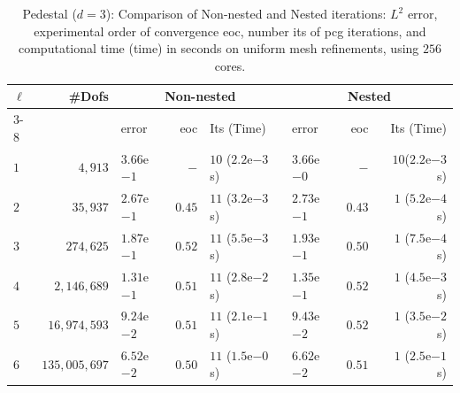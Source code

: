 \documentclass{article}
\numberwithin{equation}{section}
\begin{document}
\begin{table}[ht]
  {\small
    \begin{tabular}{|l|r|l|r|l|l|r|r|}
      \hline
      \multirow{2}{*}{$\ell$}&\multirow{2}{*}{\#Dofs}&
      \multicolumn{3}{c|}{Non-nested}&\multicolumn{3}{c|}{Nested} \\  \cline{3-8}
      &&error&eoc &Its (Time) &error&eoc & Its (Time)\\
      \hline
      $1$&$4,913$&$3.66$e$-1$&$-$&$10$ ($2.2$e$-3$ s)&$3.66$e$-0$& $-$ &$10$($2.2$e$-3$ s)\\
      $2$&$35,937$&$2.67$e$-1$&$0.45$&$11$ ($3.2$e$-3$ s)&$2.73$e$-1$ &$0.43$ & $1$ ($5.2$e$-4$ s)\\
      $3$&$274,625$&$1.87$e$-1$&$0.52$&$11$ ($5.5$e$-3$ s)&$1.93$e$-1$&$0.50$ & $1$ ($7.5$e$-4$ s)\\
      $4$&$2,146,689$&$1.31$e$-1$&$0.51$&$11$ ($2.8$e$-2$ s)&$1.35$e$-1$&$0.52$ & $1$ ($4.5$e$-3$ s)\\
      $5$&$16,974,593$&$9.24$e$-2$&$0.51$&$11$ ($2.1$e$-1$ s)&$9.43$e$-2$&$0.52$ & $1$ ($3.5$e$-2$ s)\\
      $6$&$135,005,697$&$6.52$e$-2$&$0.50$&$11$ ($1.5$e$-0$ s)&$6.62$e$-2$&$0.51$ & $1$ ($2.5$e$-1$ s)\\
      \hline
    \end{tabular}
    \caption{Pedestal ($d=3$): Comparison of Non-nested and Nested iterations: $L^2$ error, 
      experimental order of convergence eoc,
      number its of pcg iterations, and computational time (time) in seconds 
      on uniform mesh refinements, using $256$ cores.  
    } 
    \label{Tab:NumericalResults:solver_comparison_of_nonest_nested_pedestal_uniform}
  }
\end{table}
\end{document}
